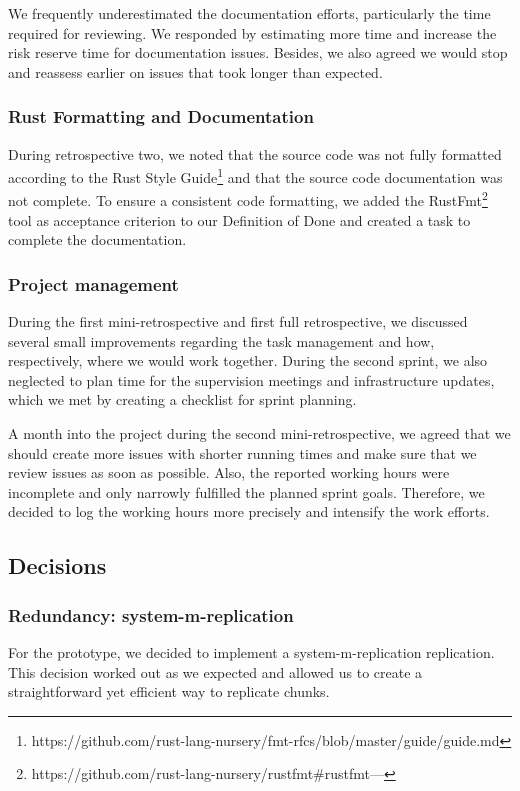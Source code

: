 We frequently underestimated the documentation efforts, particularly the time required for reviewing. We responded by estimating more time and increase the risk reserve time for documentation issues. Besides, we also agreed we would stop and reassess earlier on issues that took longer than expected.

\subsubsection{Rust Formatting and Documentation}
During retrospective two, we noted that the source code was not fully formatted according to the Rust Style Guide\footnote{https://github.com/rust-lang-nursery/fmt-rfcs/blob/master/guide/guide.md} and that the source code documentation was not complete. To ensure a consistent code formatting, we added the RustFmt\footnote{https://github.com/rust-lang-nursery/rustfmt\#rustfmt---} tool as acceptance criterion to our Definition of Done \cite{project-plan} and created a task to complete the documentation.

\subsubsection{Project management}
During the first mini-retrospective and first full retrospective, we discussed several small improvements regarding the task management and how, respectively, where we would work together. During the second sprint, we also neglected to plan time for the supervision meetings and infrastructure updates, which we met by creating a checklist for sprint planning.

A month into the project during the second mini-retrospective, we agreed that we should create more issues with shorter running times and make sure that we review issues as soon as possible. Also, the reported working hours were incomplete and only narrowly fulfilled the planned sprint goals. Therefore, we decided to log the working hours more precisely and intensify the work efforts.


\subsection{Decisions}
\subsubsection{Redundancy: \gls{system-m-replication}}
For the prototype, we decided to implement a \gls{system-m-replication} replication. This decision worked out as we expected and allowed us to create a straightforward yet efficient way to replicate \glspl{chunk}.

